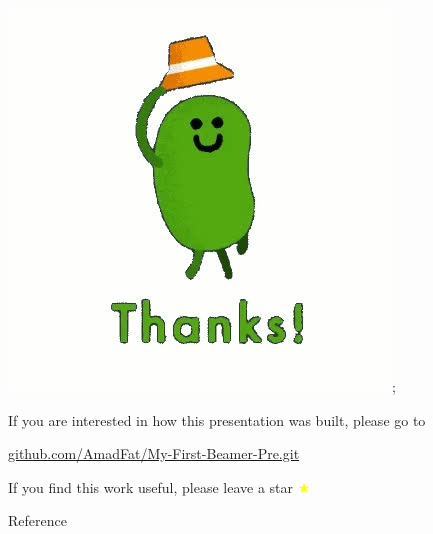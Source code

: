 \documentclass{beamer}
\begin{document}
\appendix

\begin{frame}
\centering
\includegraphics[width=0.3\linewidth]{thanks.jpg};

\vspace{5mm}

\centering
\small
\hypersetup{urlcolor=blue}
\textcolor{gray!50}{If you are interested in how this presentation was built, please go to}

\centering
\href{https://github.com/AmadFat/My-First-Beamer-Pre.git}{\textcolor{blue!50}{github.com/AmadFat/My-First-Beamer-Pre.git}}

\centering
\textcolor{gray!50}{If you find this work useful, please leave a star} 
\huge
\textcolor{yellow}{$\bigstar$}

\end{frame}

\appendix
\begin{frame}[allowframebreaks]{Reference}
\fontsize{2mm}{1mm}\selectfont


\end{frame}
\end{document}
